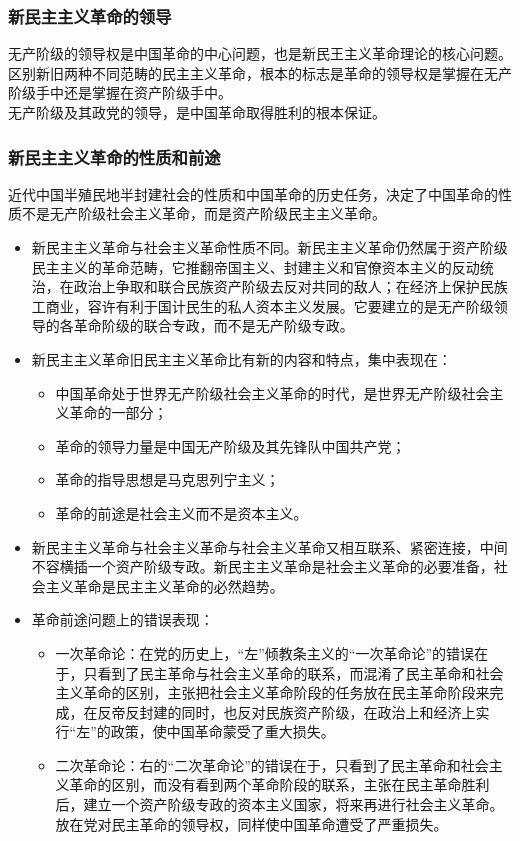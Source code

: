 \subsubsection{新民主主义革命的领导}
无产阶级的领导权是中国革命的中心问题，也是新民王主义革命理论的核心问题。区别新旧两种不同范畴的民主主义革命，根本的标志是革命的领导权是掌握在无产阶级手中还是掌握在资产阶级手中。\\
无产阶级及其政党的领导，是中国革命取得胜利的根本保证。
\subsubsection{新民主主义革命的性质和前途}
近代中国半殖民地半封建社会的性质和中国革命的历史任务，决定了中国革命的性质不是无产阶级社会主义革命，而是资产阶级民主主义革命。
\begin{itemize}
	\item 新民主主义革命与社会主义革命性质不同。新民主主义革命仍然属于资产阶级民主主义的革命范畴，它推翻帝国主义、封建主义和官僚资本主义的反动统治，在政治上争取和联合民族资产阶级去反对共同的敌人；在经济上保护民族工商业，容许有利于国计民生的私人资本主义发展。它要建立的是无产阶级领导的各革命阶级的联合专政，而不是无产阶级专政。
	\item 新民主主义革命旧民主主义革命比有新的内容和特点，集中表现在：
	\begin{itemize}
	\item 中国革命处于世界无产阶级社会主义革命的时代，是世界无产阶级社会主义革命的一部分；
		\item 革命的领导力量是中国无产阶级及其先锋队中国共产党；
		\item 革命的指导思想是马克思列宁主义；
		\item 革命的前途是社会主义而不是资本主义。
	\end{itemize}
	\item 新民主主义革命与社会主义革命与社会主义革命又相互联系、紧密连接，中间不容横插一个资产阶级专政。新民主主义革命是社会主义革命的必要准备，社会主义革命是民主主义革命的必然趋势。
	\item 革命前途问题上的错误表现：
	\begin{itemize}
		\item 一次革命论：在党的历史上，“左”倾教条主义的“一次革命论”的错误在于，只看到了民主革命与社会主义革命的联系，而混淆了民主革命和社会主义革命的区别，主张把社会主义革命阶段的任务放在民主革命阶段来完成，在反帝反封建的同时，也反对民族资产阶级，在政治上和经济上实行“左”的政策，使中国革命蒙受了重大损失。
		\item 二次革命论：右的“二次革命论”的错误在于，只看到了民主革命和社会主义革命的区别，而没有看到两个革命阶段的联系，主张在民主革命胜利后，建立一个资产阶级专政的资本主义国家，将来再进行社会主义革命。放在党对民主革命的领导权，同样使中国革命遭受了严重损失。
		 
	\end{itemize}

\end{itemize}
